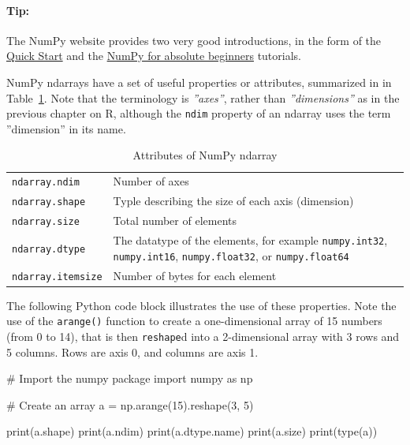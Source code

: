 \begin{tcolorbox}[colback=code]
\paragraph*{Tip:} The NumPy website provides two very good introductions, in the form of the \href{https://numpy.org/doc/stable/user/quickstart.html}{Quick Start} and the \href{
https://numpy.org/doc/stable/user/absolute_beginners.html}{NumPy for absolute beginners} tutorials.
\end{tcolorbox}

NumPy ndarrays have a set of useful properties or attributes, summarized in in Table~\ref{tab:numpydatatypes}. Note that the terminology is \emph{''axes''}, rather than \emph{''dimensions''} as in the previous chapter on R, although the \texttt{ndim} property of an ndarray uses the term ''dimension'' in its name.

\begin{table}
\centering
\renewcommand{\arraystretch}{1.25}
\begin{tabularx}{\linewidth}{l|X} \hline
\texttt{ndarray.ndim} & Number of axes \\
\texttt{ndarray.shape} & Typle describing the size of each axis (dimension)\index{Shape (of array)} \\
\texttt{ndarray.size} & Total number of elements \\
\texttt{ndarray.dtype} & The datatype of the elements, for example \texttt{numpy.int32}, \texttt{numpy.int16}, \texttt{numpy.float32}, or \texttt{numpy.float64} \\
\texttt{ndarray.itemsize} & Number of bytes for each element \\ \hline
\end{tabularx}
\caption{Attributes of NumPy ndarray}
\label{tab:numpydatatypes}
\end{table}

The following Python code block illustrates the use of these properties. Note the use of the \texttt{arange()} function to create a one-dimensional array of 15 numbers (from 0 to 14), that is then \texttt{reshape}d into a 2-dimensional array with 3 rows and 5 columns. Rows are axis 0, and columns are axis 1.

\begin{samepage}
\begin{pythoncode}
# Import the numpy package
import numpy as np

# Create an array
a = np.arange(15).reshape(3, 5)

print(a.shape)
print(a.ndim)
print(a.dtype.name)
print(a.size)
print(type(a))
\end{pythoncode}
\end{samepage}

